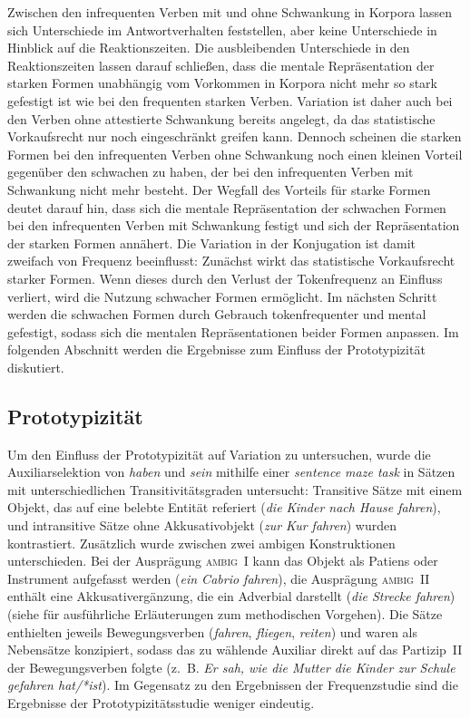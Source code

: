 Zwischen den infrequenten Verben mit und ohne Schwankung in Korpora lassen sich Unterschiede im Antwortverhalten feststellen, aber keine Unterschiede in Hinblick auf die Re\-ak\-tions\-zeiten. Die ausbleibenden Unterschiede in den Reaktionszeiten lassen darauf schließen, dass die mentale Repräsentation der starken Formen unabhängig vom Vorkommen in Korpora nicht mehr so stark gefestigt ist wie bei den frequenten starken Verben. Variation ist daher auch bei den Verben ohne attestierte Schwankung bereits angelegt, da das statistische Vorkaufsrecht nur noch eingeschränkt greifen kann. Dennoch scheinen die starken Formen bei den infrequenten Verben ohne Schwankung noch einen kleinen Vorteil gegenüber den schwachen zu haben, der bei den infrequenten Verben mit Schwankung nicht mehr besteht. Der Wegfall des Vorteils für starke Formen deutet darauf hin, dass sich die mentale Repräsentation der schwachen Formen bei den infrequenten Verben mit Schwankung festigt und sich der Repräsentation der starken Formen annähert. Die Variation in der Konjugation ist damit zweifach von Frequenz beeinflusst: Zunächst wirkt das statistische Vorkaufsrecht starker Formen. Wenn dieses durch den Verlust der Tokenfrequenz an Einfluss verliert, wird die Nutzung schwacher Formen ermöglicht. Im nächsten Schritt werden die schwachen Formen durch Gebrauch tokenfrequenter und mental gefestigt, sodass sich die mentalen Repräsentationen beider Formen anpassen. Im folgenden Abschnitt werden die Ergebnisse zum Einfluss der Prototypizität diskutiert.

\subsection{Prototypizität}

 Um den Einfluss der Prototypizität auf Variation zu untersuchen, wurde die Auxiliarselektion von \textit{haben} und \textit{sein} mithilfe einer \textit{sentence maze task} in Sätzen mit unterschiedlichen Transitivitätsgraden untersucht: Transitive Sätze mit einem Objekt, das auf eine belebte Entität referiert (\textit{die Kinder nach Hause fahren}), und intransitive Sätze ohne Akkusativobjekt (\textit{zur Kur fahren}) wurden kontrastiert. Zusätzlich wurde zwischen zwei ambigen Konstruktionen unterschieden. Bei der Ausprägung \textsc{ambig~I} kann das Objekt als Patiens oder Instrument aufgefasst werden (\textit{ein Cabrio fahren}), die Ausprägung \textsc{ambig~II} enthält eine Akkusativergänzung, die ein Adverbial darstellt (\textit{die Strecke fahren}) (siehe  für ausführliche Erläuterungen zum methodischen Vorgehen). Die Sätze enthielten jeweils Bewegungsverben (\textit{fahren}, \textit{fliegen}, \textit{reiten}) und waren als Nebensätze konzipiert, sodass das zu wählende Auxiliar direkt auf das Partizip~II der Bewegungsverben folgte (z.~B. \textit{Er sah, wie die Mutter die Kinder zur Schule gefahren hat/*ist}). Im Gegensatz zu den Ergebnissen der Frequenzstudie sind die Ergebnisse der Prototypizitätsstudie weniger eindeutig.

